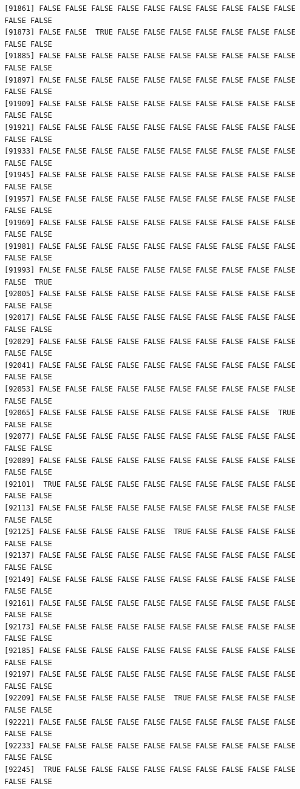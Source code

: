 \documentclass[
  a4paper,
  DIV=11,
  numbers=noendperiod]{scrartcl}
\begin{document}
\begin{verbatim}
[91861] FALSE FALSE FALSE FALSE FALSE FALSE FALSE FALSE FALSE FALSE FALSE FALSE
[91873] FALSE FALSE  TRUE FALSE FALSE FALSE FALSE FALSE FALSE FALSE FALSE FALSE
[91885] FALSE FALSE FALSE FALSE FALSE FALSE FALSE FALSE FALSE FALSE FALSE FALSE
[91897] FALSE FALSE FALSE FALSE FALSE FALSE FALSE FALSE FALSE FALSE FALSE FALSE
[91909] FALSE FALSE FALSE FALSE FALSE FALSE FALSE FALSE FALSE FALSE FALSE FALSE
[91921] FALSE FALSE FALSE FALSE FALSE FALSE FALSE FALSE FALSE FALSE FALSE FALSE
[91933] FALSE FALSE FALSE FALSE FALSE FALSE FALSE FALSE FALSE FALSE FALSE FALSE
[91945] FALSE FALSE FALSE FALSE FALSE FALSE FALSE FALSE FALSE FALSE FALSE FALSE
[91957] FALSE FALSE FALSE FALSE FALSE FALSE FALSE FALSE FALSE FALSE FALSE FALSE
[91969] FALSE FALSE FALSE FALSE FALSE FALSE FALSE FALSE FALSE FALSE FALSE FALSE
[91981] FALSE FALSE FALSE FALSE FALSE FALSE FALSE FALSE FALSE FALSE FALSE FALSE
[91993] FALSE FALSE FALSE FALSE FALSE FALSE FALSE FALSE FALSE FALSE FALSE  TRUE
[92005] FALSE FALSE FALSE FALSE FALSE FALSE FALSE FALSE FALSE FALSE FALSE FALSE
[92017] FALSE FALSE FALSE FALSE FALSE FALSE FALSE FALSE FALSE FALSE FALSE FALSE
[92029] FALSE FALSE FALSE FALSE FALSE FALSE FALSE FALSE FALSE FALSE FALSE FALSE
[92041] FALSE FALSE FALSE FALSE FALSE FALSE FALSE FALSE FALSE FALSE FALSE FALSE
[92053] FALSE FALSE FALSE FALSE FALSE FALSE FALSE FALSE FALSE FALSE FALSE FALSE
[92065] FALSE FALSE FALSE FALSE FALSE FALSE FALSE FALSE FALSE  TRUE FALSE FALSE
[92077] FALSE FALSE FALSE FALSE FALSE FALSE FALSE FALSE FALSE FALSE FALSE FALSE
[92089] FALSE FALSE FALSE FALSE FALSE FALSE FALSE FALSE FALSE FALSE FALSE FALSE
[92101]  TRUE FALSE FALSE FALSE FALSE FALSE FALSE FALSE FALSE FALSE FALSE FALSE
[92113] FALSE FALSE FALSE FALSE FALSE FALSE FALSE FALSE FALSE FALSE FALSE FALSE
[92125] FALSE FALSE FALSE FALSE FALSE  TRUE FALSE FALSE FALSE FALSE FALSE FALSE
[92137] FALSE FALSE FALSE FALSE FALSE FALSE FALSE FALSE FALSE FALSE FALSE FALSE
[92149] FALSE FALSE FALSE FALSE FALSE FALSE FALSE FALSE FALSE FALSE FALSE FALSE
[92161] FALSE FALSE FALSE FALSE FALSE FALSE FALSE FALSE FALSE FALSE FALSE FALSE
[92173] FALSE FALSE FALSE FALSE FALSE FALSE FALSE FALSE FALSE FALSE FALSE FALSE
[92185] FALSE FALSE FALSE FALSE FALSE FALSE FALSE FALSE FALSE FALSE FALSE FALSE
[92197] FALSE FALSE FALSE FALSE FALSE FALSE FALSE FALSE FALSE FALSE FALSE FALSE
[92209] FALSE FALSE FALSE FALSE FALSE  TRUE FALSE FALSE FALSE FALSE FALSE FALSE
[92221] FALSE FALSE FALSE FALSE FALSE FALSE FALSE FALSE FALSE FALSE FALSE FALSE
[92233] FALSE FALSE FALSE FALSE FALSE FALSE FALSE FALSE FALSE FALSE FALSE FALSE
[92245]  TRUE FALSE FALSE FALSE FALSE FALSE FALSE FALSE FALSE FALSE FALSE FALSE

\end{verbatim}
\end{document}
